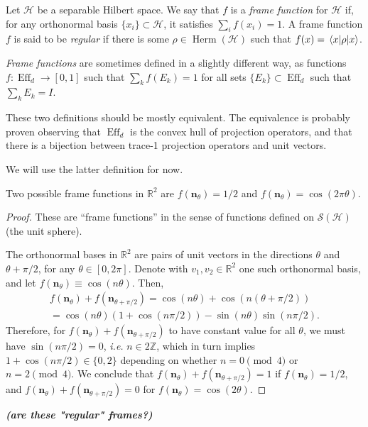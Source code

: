 \documentclass[a4paper]{report}
\newcommand{\ZZ}{\mathbb{Z}}
\newcommand{\RR}{\mathbb{R}}
\newcommand{\on}[1]{\operatorname{#1}}
\newcommand{\bs}[1]{\boldsymbol{#1}}
\newcommand{\calH}{{\mathcal{H}}}
\newcommand{\calS}{{\mathcal{S}}}
\newcommand{\wondering}[1]{{\color{red}\itshape\bfseries (#1)}}
\DeclareMathOperator{\Herm}{Herm}
\begin{document}
\begin{defn}
	Let $\calH$ be a separable Hilbert space.
	We say that $f$ is a \emph{frame function} for $\calH$ if, for any orthonormal basis $\{x_i\}\subset\calH$, it satisfies
	$\sum_i f(x_i) = 1$.
	A frame function $f$ is said to be \emph{regular} if there is some $\rho\in\Herm(\calH)$ such that $f(x)=\mel{x}{\rho}{x}$.
\end{defn}

\begin{defn}
	\emph{Frame functions} are sometimes defined in a slightly different way, as functions $f:\on{Eff}_d\to[0,1]$ such that $\sum_k f(E_k)=1$ for all sets $\{E_k\}\subset\on{Eff}_d$ such that $\sum_k E_k=I$.
\end{defn}
These two definitions should be mostly equivalent. The equivalence is probably proven observing that $\on{Eff}_d$ is the convex hull of projection operators, and that there is a bijection between trace-1 projection operators and unit vectors.

We will use the latter definition for now.

\begin{example}
	Two possible frame functions in $\RR^2$ are $f(\bs n_\theta)=1/2$ and $f(\bs n_\theta)=\cos(2\pi \theta)$.
\end{example}
\begin{proof}
	These are ``frame functions'' in the sense of functions defined on $\calS(\calH)$ (the unit sphere).

	The orthonormal bases in $\RR^2$ are pairs of unit vectors in the directions $\theta$ and $\theta+\pi/2$, for any $\theta\in[0,2\pi]$.
	Denote with $v_1, v_2\in\RR^2$ one such orthonormal basis, and let $f(\bs n_\theta)\equiv \cos(n\theta)$. Then,
	\begin{equation}
	\begin{gathered}
		f(\bs n_\theta) + f(\bs n_{\theta+\pi/2})
		= \cos(n \theta) + \cos(n(\theta+\pi/2)) \\
		= \cos(n\theta)(1 + \cos(n\pi/2)) - \sin(n\theta) \sin(n\pi/2).
	\end{gathered}
	\end{equation}
	Therefore, for $f(\bs n_\theta) + f(\bs n_{\theta+\pi/2})$ to have constant value for all $\theta$, we must have $\sin(n\pi/2)=0$, \emph{i.e.} $n\in 2\ZZ$, which in turn implies $1+\cos(n\pi/2)\in\{0,2\}$ depending on whether $n=0\pmod 4$ or ${n=2\pmod 4}$.
	We conclude that $f(\bs n_\theta) + f(\bs n_{\theta+\pi/2})=1$ if $f(\bs n_\theta)=1/2$, and
	$f(\bs n_\theta) + f(\bs n_{\theta+\pi/2})=0$ for $f(\bs n_\theta)=\cos(2\theta)$.
\end{proof}
\wondering{are these "regular" frames?}
\end{document}
